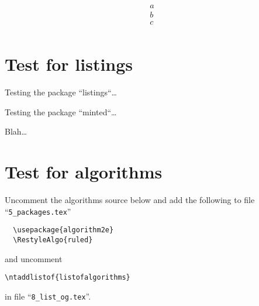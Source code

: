 \begin{eqnarray}
a\\
b\\
c\\
\end{eqnarray}

\section{Test for listings} %
\label{sec:test_for_listings}

Testing the package “listings“…


Testing the package “minted“…


Blah…

\section{Test for algorithms}
\label{sec:test_for_algorithms}

Uncomment the algorithms source below and add the following to file “\verb!5_packages.tex!”
\begin{verbatim}
  \usepackage{algorithm2e}
  \RestyleAlgo{ruled}
\end{verbatim}
and uncomment
\begin{verbatim}
\ntaddlistof{listofalgorithms}
\end{verbatim}
in file “\verb!8_list_og.tex!”.




